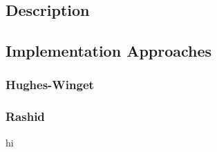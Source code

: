 \subsection{Description}
\label{Description}

\subsection{Implementation Approaches}
\label{Implementation Approaches}
\subsubsection{Hughes-Winget}
\label{Hughes-Winget}

\subsubsection{Rashid}
\label{Rashid}

hi